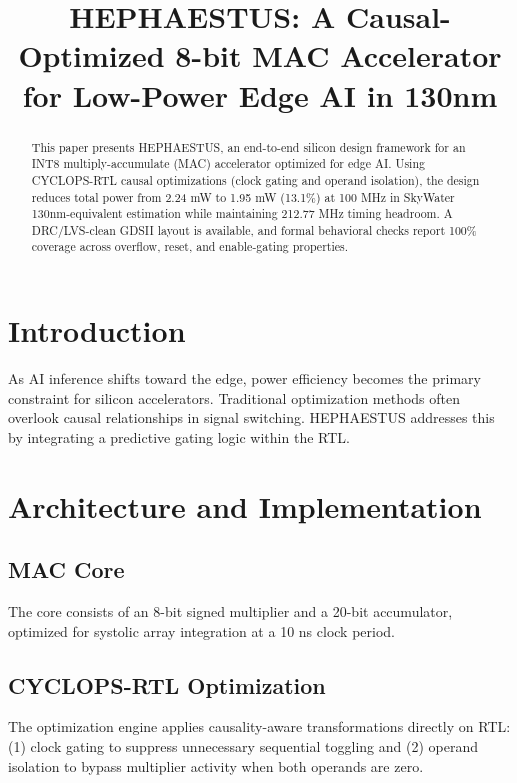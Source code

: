\documentclass[10pt, conference]{IEEEtran}
\title{HEPHAESTUS: A Causal-Optimized 8-bit MAC Accelerator for Low-Power Edge AI in 130nm}
\author{
    \IEEEauthorblockN{George David Tsitlauri}
    \IEEEauthorblockA{\textit{Dept. of Informatics \& Telecommunications}\\
    \textit{University of Thessaly, Greece}\\
    gdtsitlauri@gmail.com}
}
\begin{document}
\maketitle

\begin{abstract}
This paper presents HEPHAESTUS, an end-to-end silicon design framework for an INT8 multiply-accumulate (MAC) accelerator optimized for edge AI. Using CYCLOPS-RTL causal optimizations (clock gating and operand isolation), the design reduces total power from 2.24 mW to 1.95 mW (13.1\%) at 100 MHz in SkyWater 130nm-equivalent estimation while maintaining 212.77 MHz timing headroom. A DRC/LVS-clean GDSII layout is available, and formal behavioral checks report 100\% coverage across overflow, reset, and enable-gating properties.
\end{abstract}

\section{Introduction}
As AI inference shifts toward the edge, power efficiency becomes the primary constraint for silicon accelerators. Traditional optimization methods often overlook causal relationships in signal switching. HEPHAESTUS addresses this by integrating a predictive gating logic within the RTL.

\section{Architecture and Implementation}
\subsection{MAC Core}
The core consists of an 8-bit signed multiplier and a 20-bit accumulator, optimized for systolic array integration at a 10 ns clock period.
\subsection{CYCLOPS-RTL Optimization}
The optimization engine applies causality-aware transformations directly on RTL: (1) clock gating to suppress unnecessary sequential toggling and (2) operand isolation to bypass multiplier activity when both operands are zero.
\end{document}
